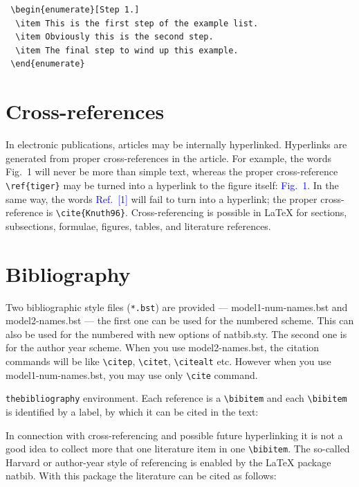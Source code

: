 \documentclass[a4paper,fleqn]{cas-sc}
\begin{document}
\begin{verbatim}
 \begin{enumerate}[Step 1.]
  \item This is the first step of the example list.
  \item Obviously this is the second step.
  \item The final step to wind up this example.
 \end{enumerate}
\end{verbatim}

\section{Cross-references}
In electronic publications, articles may be internally
hyperlinked. Hyperlinks are generated from proper
cross-references in the article.  For example, the words
\textcolor{black!80}{Fig.~1} will never be more than simple text,
whereas the proper cross-reference \verb+\ref{tiger}+ may be
turned into a hyperlink to the figure itself:
\textcolor{blue}{Fig.~1}.  In the same way,
the words \textcolor{blue}{Ref.~[1]} will fail to turn into a
hyperlink; the proper cross-reference is \verb+\cite{Knuth96}+.
Cross-referencing is possible in \LaTeX{} for sections,
subsections, formulae, figures, tables, and literature
references.

\section{Bibliography}

Two bibliographic style files (\verb+*.bst+) are provided ---
{model1-num-names.bst} and {model2-names.bst} --- the first one can be
used for the numbered scheme. This can also be used for the numbered
with new options of {natbib.sty}. The second one is for the author year
scheme. When  you use model2-names.bst, the citation commands will be
like \verb+\citep+,  \verb+\citet+, \verb+\citealt+ etc. However when
you use model1-num-names.bst, you may use only \verb+\cite+ command.

\verb+thebibliography+ environment.  Each reference is a
\verb+\bibitem+ and each \verb+\bibitem+ is identified by a label,
by which it can be cited in the text:

\noindent In connection with cross-referencing and
possible future hyperlinking it is not a good idea to collect
more that one literature item in one \verb+\bibitem+.  The
so-called Harvard or author-year style of referencing is enabled
by the \LaTeX{} package {natbib}. With this package the
literature can be cited as follows:
\end{document}
